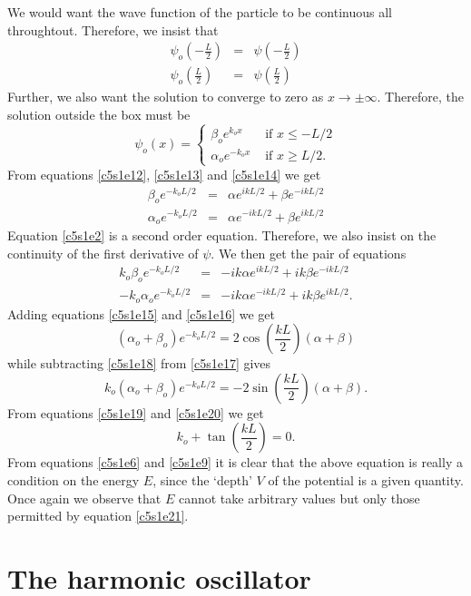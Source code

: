 We would want the wave function of the particle to be continuous all 
throughtout. Therefore, we insist that
\begin{eqnarray}
\psi_o\left(-\frac{L}{2}\right) &=& \psi\left(-\frac{L}{2}\right) 
  \label{c5s1e12} \\
\psi_o\left(\frac{L}{2}\right) &=& \psi\left(\frac{L}{2}\right) 
  \label{c5s1e13} 
\end{eqnarray}
Further, we also want the solution to converge to zero as $x \rightarrow \pm
\infty$. Therefore, the solution outside the box must be
\begin{equation}\label{c5s1e14}
\psi_o(x) = \begin{cases}
\beta_o e^{k_ox} & \text{ if } x \le -L/2 \\
\alpha_o e^{-k_ox} & \text{ if } x \ge L/2.
\end{cases}
\end{equation}
From equations \eqref{c5s1e12}, \eqref{c5s1e13} and \eqref{c5s1e14} we get
\begin{eqnarray}
\beta_o e^{-k_oL/2} &=& \alpha e^{ikL/2} + \beta e^{-ikL/2} \label{c5s1e15} \\
\alpha_o e^{-k_oL/2} &=& \alpha e^{-ikL/2} + \beta e^{ikL/2} \label{c5s1e16}
\end{eqnarray}
Equation \eqref{c5s1e2} is a second order equation. Therefore, we also insist
on the continuity of the first derivative of $\psi$. We then get the pair of
equations
\begin{eqnarray}
k_o\beta_o e^{-k_oL/2} &=& -ik\alpha e^{ikL/2} + ik\beta e^{-ikL/2} 
   \label{c5s1e17} \\
-k_o\alpha_o e^{-k_oL/2} &=& -ik\alpha e^{-ikL/2} + ik\beta e^{ikL/2}.
   \label{c5s1e18}
\end{eqnarray}
Adding equations \eqref{c5s1e15} and \eqref{c5s1e16} we get
\begin{equation}\label{c5s1e19}
(\alpha_o + \beta_o)e^{-k_oL/2} = 2\cos\left(\frac{kL}{2}\right)(\alpha + \beta)
\end{equation}
while subtracting \eqref{c5s1e18} from \eqref{c5s1e17} gives
\begin{equation}\label{c5s1e20}
k_o(\alpha_o + \beta_o)e^{-k_oL/2} = -2\sin\left(\frac{kL}{2}\right)(\alpha +
\beta).
\end{equation}
From equations \eqref{c5s1e19} and \eqref{c5s1e20} we get
\begin{equation}\label{c5s1e21}
k_o + \tan\left(\frac{kL}{2}\right) = 0.
\end{equation}
From equations \eqref{c5s1e6} and \eqref{c5s1e9} it is clear that the above
equation is really a condition on the energy $E$, since the `depth' $V$ of the
potential is a given quantity. Once again we observe that $E$ cannot take 
arbitrary values but only those permitted by equation \eqref{c5s1e21}.

\section{The harmonic oscillator}\label{c5s2}

